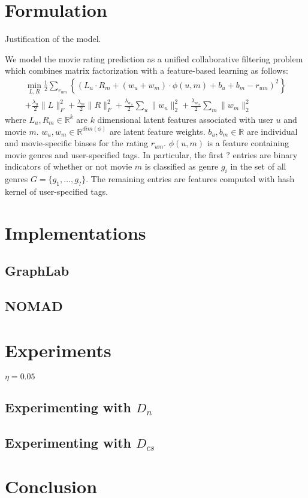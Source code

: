 \documentclass{article} %
\begin{document}
\section{Formulation}
Justification of the model.

We model the movie rating prediction as a unified collaborative filtering problem which combines matrix factorization with a feature-based learning as follows:
\begin{multline}
\min_{L, R} \frac{1}{2}\sum_{r_{um}} \left\{(L_u \cdot R_m + (w_u + w_m) \cdot \phi(u, m) + b_u + b_m - r_{um})^2\right\}\\ + \frac{\lambda_u}{2}\|L\|^2_F + \frac{\lambda_m}{2}\|R\|^2_F + \frac{\lambda_{w_u}}{2}\sum_u\|w_u\|^2_2 + \frac{\lambda_{w_m}}{2}\sum_m\|w_m\|^2_2
\end{multline}
where $L_u, R_m \in \mathbb{R}^k$ are $k$ dimensional latent features associated with user $u$ and movie $m$. $w_u,w_m \in \mathbb{R}^{dim(\phi)}$ are latent feature weights. $b_u, b_m \in \mathbb{R}$ are individual and movie-specific biases for the rating $r_{um}$. $\phi(u, m)$ is a feature containing movie genres and user-specified tags. In particular, the first $?$ entries are binary indicators of whether or not movie $m$ is classified as genre $g_i$ in the set of all genres $G = \{g_1,\ldots, g_?\}$. The remaining entries are features computed with hash kernel of user-specified tags.
\section{Implementations}
\subsection{GraphLab}
\subsection{NOMAD}
\section{Experiments}

$\eta=0.05$

\subsection{Experimenting with $D_n$}

\subsection{Experimenting with $D_{cs}$}


\section{Conclusion}



{}
\end{document}

